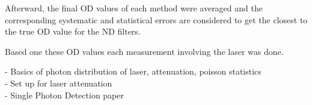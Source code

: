 Afterward, the final OD values of each method were averaged and the corresponding systematic and statistical errors are
considered to get the closest to the true OD value for the ND filters.

Based one these OD values each measurement involving the laser was done.






- Basics of photon distribution of laser, attenuation, poisson statistics \\
- Set up for laser attenuation \\
- Single Photon Detection paper \\

\FloatBarrier


